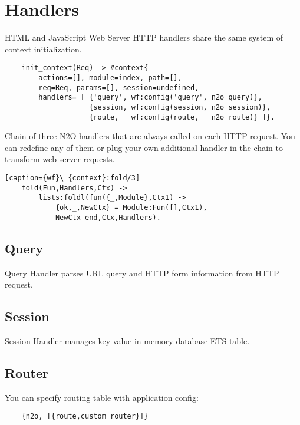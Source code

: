 
\section{Handlers}
HTML and JavaScript Web Server HTTP handlers share the same system
of context initialization.

\vspace{1\baselineskip}
\begin{lstlisting}
    init_context(Req) -> #context{
        actions=[], module=index, path=[],
        req=Req, params=[], session=undefined,
        handlers= [ {'query', wf:config('query', n2o_query)},
                    {session, wf:config(session, n2o_session)},
                    {route,   wf:config(route,   n2o_route)} ]}.
\end{lstlisting}
\vspace{1\baselineskip}

Chain of three N2O handlers that are always called
on each HTTP request. You can redefine any of them or plug your own
additional handler in the chain to transform web server requests.

\vspace{1\baselineskip}
\begin{lstlisting}[caption={wf}\_{context}:fold/3]
    fold(Fun,Handlers,Ctx) ->
        lists:foldl(fun({_,Module},Ctx1) ->
            {ok,_,NewCtx} = Module:Fun([],Ctx1),
            NewCtx end,Ctx,Handlers).
\end{lstlisting}
\vspace{1\baselineskip}

\subsection{Query}
Query Handler parses URL query and HTTP form information from HTTP request.

\subsection{Session}
Session Handler manages key-value in-memory database ETS table.

\newpage
\subsection{Router}
You can specify routing table with application config:

\vspace{1\baselineskip}
\begin{lstlisting}
    {n2o, [{route,custom_router}]}
\end{lstlisting}
\vspace{1\baselineskip}

